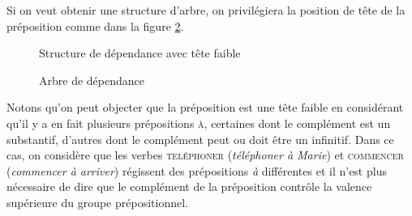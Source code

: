 Si on veut obtenir une structure d'arbre, on privilégiera la position de tête de la préposition comme dans la figure \ref{fig:teteprep}.




\begin{figure}[H]
\caption{Structure de dépendance avec tête faible\label{fig:tetefaible}}
\end{figure}

\begin{figure}[H]
\caption{Arbre de dépendance\label{fig:teteprep}}
\end{figure}

Notons qu'on peut objecter que la préposition est une tête faible en considérant qu'il y a en fait  plusieurs prépositions \textsc{à}, certaines dont le complément est un substantif, d'autres dont le complément peut ou doit être un infinitif. Dans ce cas, on considère que les verbes \textsc{teléphoner} (\textit{téléphoner à Marie}) et \textsc{commencer} (\textit{commencer à arriver}) régissent des prépositions \textit{à} différentes et il n’est plus nécessaire de dire que le complément de la préposition contrôle la valence supérieure du groupe prépositionnel.


